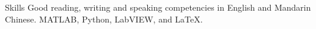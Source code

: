 
\begin{rubric}{Skills}
\entry*[Languages]
Good reading, writing and speaking competencies in English and Mandarin Chinese.
	MATLAB, Python, LabVIEW, and \LaTeX.
\end{rubric}
